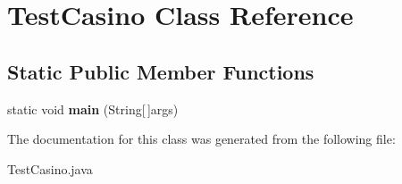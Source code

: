 \hypertarget{class_test_casino}{}\section{Test\+Casino Class Reference}
\label{class_test_casino}
\subsection*{Static Public Member Functions}
\begin{DoxyCompactItemize}
\item 
static void {\bfseries main} (String\mbox{[}$\,$\mbox{]}args)\hypertarget{class_test_casino_ad9e5747483705ef7be5d85911855d32a}{}\label{class_test_casino_ad9e5747483705ef7be5d85911855d32a}

\end{DoxyCompactItemize}


The documentation for this class was generated from the following file\+:\begin{DoxyCompactItemize}
\item 
Test\+Casino.\+java\end{DoxyCompactItemize}
